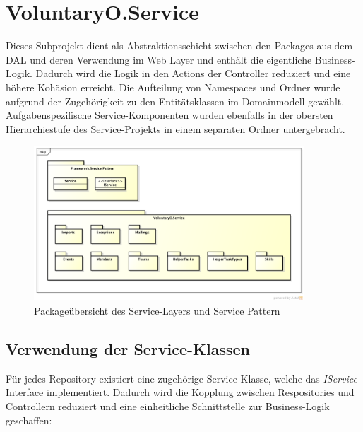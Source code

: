 \newpage
\section{VoluntaryO.Service}
	Dieses Subprojekt dient als Abstraktionsschicht zwischen den Packages aus dem DAL und deren Verwendung im Web Layer und enthält die eigentliche Business-Logik. Dadurch wird die Logik in den Actions der Controller reduziert und eine höhere Kohäsion erreicht. Die Aufteilung  von Namespaces und Ordner wurde aufgrund der Zugehörigkeit zu den Entitätsklassen im Domainmodell gewählt. Aufgabenspezifische Service-Komponenten wurden ebenfalls in der obersten Hierarchiestufe des Service-Projekts in einem separaten Ordner untergebracht.
	
	\begin{figure}[H]
	    	\centering
	    	 \includegraphics[width=0.9\textwidth]{content/architekturdokumentation/images/Service_Overview.png}
	  		\vspace{-25pt}
			\caption{Packageübersicht des Service-Layers und Service Pattern}
	\end{figure}
	
	\subsection{Verwendung der Service-Klassen}
	Für jedes Repository existiert eine zugehörige Service-Klasse, welche das \textit{IService} Interface implementiert. Dadurch wird die Kopplung zwischen Respositories und Controllern reduziert und eine einheitliche Schnittstelle zur Business-Logik geschaffen:
	
